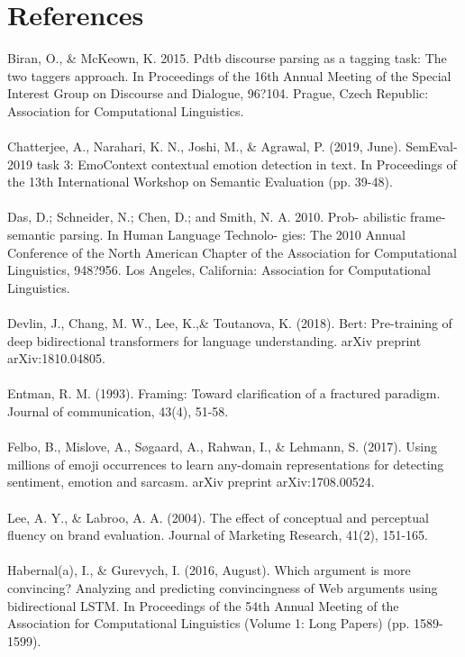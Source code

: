 \documentclass[11pt,a4paper]{article}
\begin{document}


\section{References}
Biran, O., \& McKeown, K. 2015. Pdtb discourse parsing as a tagging task: The two taggers approach. In Proceedings of the 16th Annual Meeting of the Special Interest Group on Discourse and Dialogue, 96?104. Prague, Czech Republic: Association for Computational Linguistics.
\\\\
Chatterjee, A., Narahari, K. N., Joshi, M., \& Agrawal, P. (2019, June). SemEval-2019 task 3: EmoContext contextual emotion detection in text. In Proceedings of the 13th International Workshop on Semantic Evaluation (pp. 39-48).
\\\\
Das, D.; Schneider, N.; Chen, D.; and Smith, N. A. 2010. Prob- abilistic frame-semantic parsing. In Human Language Technolo- gies: The 2010 Annual Conference of the North American Chapter of the Association for Computational Linguistics, 948?956. Los Angeles, California: Association for Computational Linguistics.
\\\\
Devlin, J., Chang, M. W., Lee, K.,\& Toutanova, K. (2018). Bert: Pre-training of deep bidirectional transformers for language understanding. arXiv preprint arXiv:1810.04805.
\\\\
Entman, R. M. (1993). Framing: Toward clarification of a fractured paradigm. Journal of communication, 43(4), 51-58.
\\\\
Felbo, B., Mislove, A., S{\o}gaard, A., Rahwan, I., \& Lehmann, S. (2017). Using millions of emoji occurrences to learn any-domain representations for detecting sentiment, emotion and sarcasm. arXiv preprint arXiv:1708.00524.
\\\\
Lee, A. Y., \& Labroo, A. A. (2004). The effect of conceptual and perceptual fluency on brand evaluation. Journal of Marketing Research, 41(2), 151-165.
\\\\
Habernal(a), I., \& Gurevych, I. (2016, August). Which argument is more convincing? Analyzing and predicting convincingness of Web arguments using bidirectional LSTM. In Proceedings of the 54th Annual Meeting of the Association for Computational Linguistics (Volume 1: Long Papers) (pp. 1589-1599).
\end{document}
